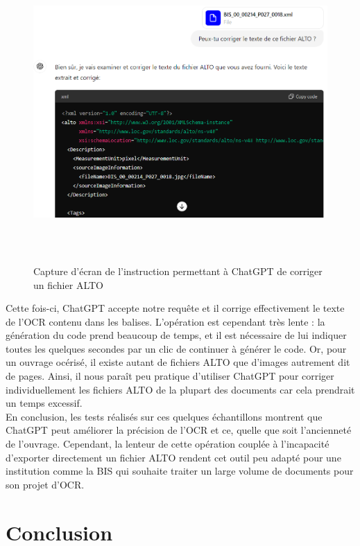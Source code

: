 \documentclass[a4paper,12pt,twoside]{book}
\begin{document}
\begin{figure} [H]
	\includegraphics[width=6.26806in,height=4.51389in]{vertopal_157ae480aa4a4b07be198b586a812241/media/image20.png}
	\caption{Capture d'écran de l'instruction permettant à ChatGPT de corriger un fichier ALTO}
\end{figure}


Cette fois-ci, ChatGPT accepte notre requête et il corrige effectivement
le texte de l'OCR contenu dans les balises. L'opération est cependant
très lente : la génération du code prend beaucoup de temps, et il est
nécessaire de lui indiquer toutes les quelques secondes par un clic de
continuer à générer le code. Or, pour un ouvrage océrisé, il existe
autant de fichiers ALTO que d'images autrement dit de pages. Ainsi, il
nous paraît peu pratique d'utiliser ChatGPT pour corriger
individuellement les fichiers ALTO de la plupart des documents car cela
prendrait un temps excessif. \\

En conclusion, les tests réalisés sur ces quelques échantillons montrent
que ChatGPT peut améliorer la précision de l'OCR et ce, quelle que soit
l'ancienneté de l'ouvrage. Cependant, la lenteur de cette opération
couplée à l'incapacité d'exporter directement un fichier ALTO rendent
cet outil peu adapté pour une institution comme la BIS qui souhaite
traiter un large volume de documents pour son projet d'OCR.
	
	
	\chapter*{Conclusion}
	
\end{document}
